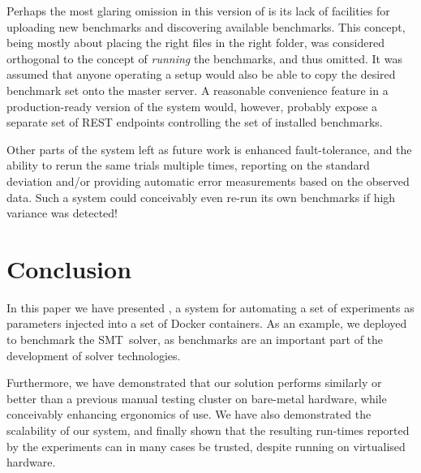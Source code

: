 \documentclass[a4paper]{IEEEtran}
\begin{document}
Perhaps the most glaring omission in this version of \testbench{} is its lack of
facilities for uploading new benchmarks and discovering available benchmarks.
This concept, being mostly about placing the right files in the right folder,
was considered orthogonal to the concept of \emph{running} the benchmarks, and
thus omitted. It was assumed that anyone operating a \testbench{} setup would
also be able to copy the desired benchmark set onto the master server. A
reasonable convenience feature in a production-ready version of the system
would, however, probably expose a separate set of REST endpoints controlling the
set of installed benchmarks.

Other parts of the system left as future work is enhanced fault-tolerance, and
the ability to rerun the same trials multiple times, reporting on the standard
deviation and/or providing automatic error measurements based on the observed
data. Such a system could conceivably even re-run its own benchmarks if high
variance was detected!

\section{Conclusion}

In this paper we have presented \testbench{}, a system for automating a set of
experiments as parameters injected into a set of Docker containers. As an
example, we deployed \testbench{} to benchmark the \uppsat{} SMT~solver, as
benchmarks are an important part of the development of solver technologies.

Furthermore, we have demonstrated that our solution performs similarly or better
than a previous manual testing cluster on bare-metal hardware, while conceivably
enhancing ergonomics of use. We have also demonstrated the scalability of our
system, and finally shown that the resulting run-times reported by the
experiments can in many cases be trusted, despite running on virtualised
hardware.

\printbibliography
\end{document}

